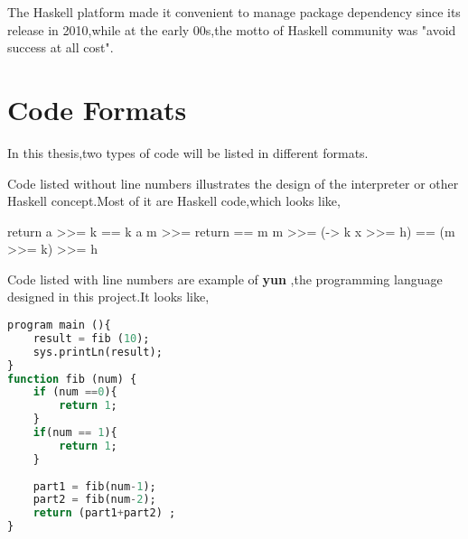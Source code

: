 The Haskell platform made it convenient to manage package dependency since its release in 2010,while at the early 00s,the motto of Haskell community was "avoid success at all cost"\cite{jones_wearing_2003}.


\section{Code Formats}
In this thesis,two types of code will be listed in different formats.

Code listed without line numbers illustrates the design of the interpreter or other Haskell concept.Most of it are Haskell code,which looks like,
\begin{hcode}
 return a >>= k  ==  k a
 m >>= return  ==  m
 m >>= (\x -> k x >>= h)  ==  (m >>= k) >>= h
\end{hcode}


Code listed with line numbers are example of \textbf{yun} ,the programming language designed in this project.It looks like,

\begin{lstlisting}[language=SQL]
program main (){
	result = fib (10);
	sys.printLn(result);	
} 
function fib (num) {
	if (num ==0){
		return 1;
	}
	if(num == 1){
		return 1;
	}
	
	part1 = fib(num-1);
	part2 = fib(num-2);
	return (part1+part2) ;
}
\end{lstlisting}